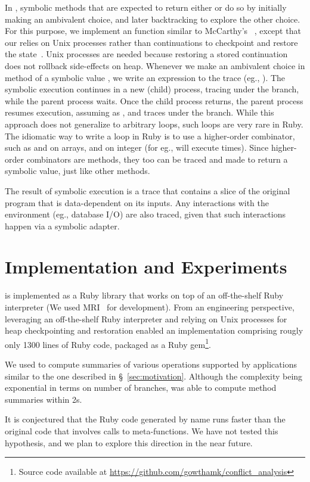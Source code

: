 In \name, symbolic methods that are expected to return either 
or  do so by initially making an ambivalent choice, and later
backtracking to explore the other choice. For this purpose, we
implement an  function similar to McCarthy's
~\cite{amb}, except that our  relies on Unix processes
rather than continuations to checkpoint and restore the
state~\cite{StackOverflow}. Unix processes are needed because
restoring a stored continuation does not rollback side-effects on
heap. Whenever we make an ambivalent choice in method  of a
symbolic value , we write an  expression to the trace (eg.,
).  The symbolic execution
continues in a new (child) process, tracing under the  branch,
while the parent process waits.  Once the child process returns, the
parent process resumes execution, assuming  as , and
traces under the  branch. While this approach does not
generalize to arbitrary loops, such loops are very rare in Ruby. The
idiomatic way to write a loop in Ruby is to use a higher-order
combinator, such as  and  on arrays, and  on
integer (for eg.,  will execute   times).
Since higher-order combinators are methods, they too can be traced and
made to return a symbolic value, just like other methods. 

The result of symbolic execution is a trace that contains a slice
of the original program that is data-dependent on its inputs. Any
interactions with the environment (eg., database I/O) are also traced,
given that such interactions happen via a symbolic adapter. 

\section{Implementation and Experiments}

\name is implemented as a Ruby library that works on top of an
off-the-shelf Ruby interpreter (We used MRI~\cite{MRI} for
development). From an engineering perspective, leveraging an
off-the-shelf Ruby interpreter and relying on Unix processes for heap
checkpointing and restoration enabled an implementation comprising
rougly only 1300 lines of Ruby code, packaged as a Ruby
gem\footnote{Source code available at
\url{https://github.com/gowthamk/conflict_analysis}}.

We used \name to compute summaries of various operations supported by
applications similar to the one described in \S~\ref{sec:motivation}.
Although the complexity being exponential in terms on number of
branches, \name was able to compute method summaries within 2s. 

It is conjectured that the Ruby code generated by name runs faster
than the original code that involves calls to meta-functions. We have
not tested this hypothesis, and we plan to explore this direction in
the near future.

